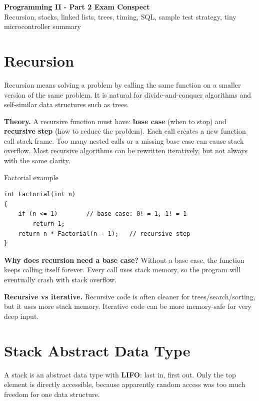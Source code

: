 \documentclass[9pt,a4paper]{article}
\begin{document}
\begin{center}
  {\LARGE \textbf{Programming II - Part 2 Exam Conspect}}\\[-1pt]
  {\small Recursion, stacks, linked lists, trees, timing, SQL, sample test strategy, tiny microcontroller summary}
\end{center}
\vspace{-0.5em}
\tableofcontents
\vspace{0.5em}

\section{Recursion}
\begin{idea}
Recursion means solving a problem by calling the same function on a smaller version of the same problem. It is natural for divide-and-conquer algorithms and self-similar data structures such as trees.
\end{idea}

\textbf{Theory.} A recursive function must have: \textbf{base case} (when to stop) and \textbf{recursive step} (how to reduce the problem). Each call creates a new function call stack frame. Too many nested calls or a missing base case can cause stack overflow. Most recursive algorithms can be rewritten iteratively, but not always with the same clarity.

\begin{codebox}{Factorial example}
\begin{lstlisting}[style=cstyle]
int Factorial(int n)
{
    if (n <= 1)        // base case: 0! = 1, 1! = 1
        return 1;
    return n * Factorial(n - 1);   // recursive step
}
\end{lstlisting}
\end{codebox}

\begin{exam}
\textbf{Why does recursion need a base case?} Without a base case, the function keeps calling itself forever. Every call uses stack memory, so the program will eventually crash with stack overflow.\par
\textbf{Recursive vs iterative.} Recursive code is often cleaner for trees/search/sorting, but it uses more stack memory. Iterative code can be more memory-safe for very deep input.
\end{exam}

\section{Stack Abstract Data Type}
\begin{idea}
A stack is an abstract data type with \textbf{LIFO}: last in, first out. Only the top element is directly accessible, because apparently random access was too much freedom for one data structure.
\end{idea}
\end{document}
